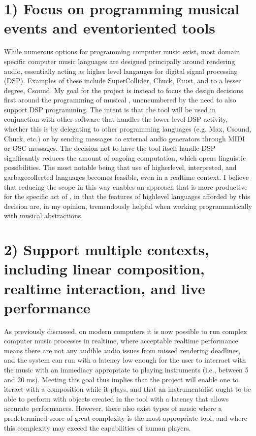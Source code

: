 \documentclass[letterpaper,10pt,english]{sphinxmanual}
\begin{document}
\section{1) Focus on programming musical events and event\sphinxhyphen{}oriented tools}
\label{\detokenize{goals:focus-on-programming-musical-events-and-event-oriented-tools}}
\sphinxAtStartPar
While numerous options for programming computer music exist, most domain specific computer music languages are
designed principally around rendering audio, essentially acting as higher level langauges for digital signal processing (DSP).
Examples of these include SuperCollider, Chuck, Faust, and to a lesser degree, Csound.
My goal for the project is instead to focus the design decisions first around the programming of musical ,
unencumbered by the need to also support DSP programming.
The intent is that the tool will be used in conjunction with other software that handles the lower level DSP activity,
whether this is by delegating to other programming languages (e.g. Max, Csound, Chuck, etc.)
or by sending messages to external audio generators through MIDI or OSC messages.
The decision not to have the tool itself handle DSP
significantly reduces the amount of ongoing computation, which opens linguistic possibilities.
The most notable being that use of higher\sphinxhyphen{}level, interpreted, and garbage\sphinxhyphen{}collected languages becomes feasible,
even in a realtime context.
I believe that reducing the scope in this way enables an approach that is more productive
for the specific act of , in that the features of high\sphinxhyphen{}level languages afforded by this decision
are, in my opinion, tremendously helpful when working programmatically with musical abstractions.


\section{2) Support multiple contexts, including linear composition, realtime interaction, and live performance}
\label{\detokenize{goals:support-multiple-contexts-including-linear-composition-realtime-interaction-and-live-performance}}
\sphinxAtStartPar
As previously discussed, on modern computers it is now possible to run complex computer music processes in realtime,
where acceptable realtime performance means there are not any audible audio issues from missed rendering deadlines, and the system can run with a
latency low enough for the user to interract with the music with an immediacy appropriate to playing instruments (i.e., between 5 and 20 ms).
Meeting this goal thus implies that the project will enable one to iteract with a composition while it plays,
and that an instrumentalist ought to be able to perform with objects created in the tool with a latency that allows accurate performances.
However, there also exist types of music where a predetermined score of great complexity is the most
appropriate tool, and where this complexity may exceed the capabilities of human players.
\end{document}
